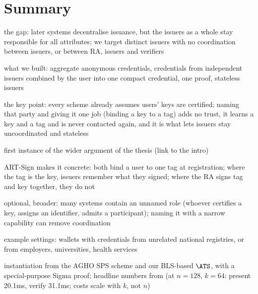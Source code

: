 \section{Summary}\label{sec:agg-creds-summary}

\begin{outline}
  \item the gap: later systems decentralise issuance, but the issuers as a whole stay responsible for all attributes; we target distinct issuers with no coordination between issuers, or between RA, issuers and verifiers
  \item what we built: aggregate anonymous credentials, credentials from independent issuers combined by the user into one compact credential, one proof, stateless issuers
  \item the key point: every scheme already assumes users' keys are certified; naming that party and giving it one job (binding a key to a tag) adds no trust, it learns a key and a tag and is never contacted again, and it is what lets issuers stay uncoordinated and stateless
  \item first instance of the wider argument of the thesis (link to the intro)
  \item ART-Sign makes it concrete: both bind a user to one tag at registration; where the tag is the key, issuers remember what they signed; where the RA signs tag and key together, they do not
\end{outline}

\begin{outline}
  \item optional, broader: many systems contain an unnamed role (whoever certifies a key, assigns an identifier, admits a participant); naming it with a narrow capability can remove coordination
  \item example settings: wallets with credentials from unrelated national registries, or from employers, universities, health services
\end{outline}

\begin{outline}
  \item instantiation from the AGHO SPS scheme and our BLS-based $\ATS$, with a special-purpose Sigma proof; headline numbers from  (at $n = 128$, $k = 64$: present 20.1ms, verify 31.1ms; costs scale with $k$, not $n$)
\end{outline}

